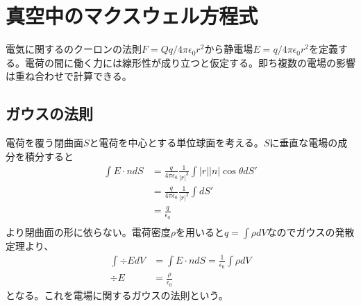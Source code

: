 \section{真空中のマクスウェル方程式}

電気に関するのクーロンの法則$F = Qq/4\pi\epsilon_0r^2$から静電場$E = q/4\pi\epsilon_0r^2$を定義する。電荷の間に働く力には線形性が成り立つと仮定する。即ち複数の電場の影響は重ね合わせで計算できる。

\subsection{ガウスの法則}
    電荷を覆う閉曲面$S$と電荷を中心とする単位球面を考える。$S$に垂直な電場の成分を積分すると
    \begin{align*}
        \int E \cdot n dS
        &= \frac{q}{4\pi\epsilon_0}\frac{1}{|r|^3}\int |r||n|\cos\theta dS'\\
        &= \frac{q}{4\pi\epsilon_0}\frac{1}{|r|^2}\int dS'\\
        &= \frac{q}{\epsilon_0}\\
    \end{align*}
    より閉曲面の形に依らない。電荷密度$\rho$を用いると$q = \int \rho dV$なのでガウスの発散定理より、
    \begin{align*}
        \int \div EdV &= \int E \cdot n dS = \frac{1}{\epsilon_0}\int \rho dV\\
        \div E &= \frac{\rho}{\epsilon_0}
    \end{align*}
    となる。これを電場に関するガウスの法則という。

